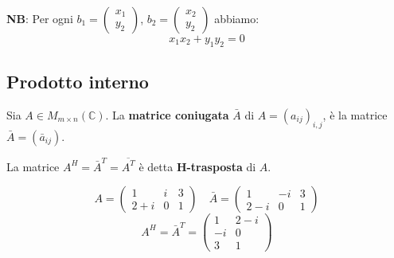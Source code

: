\documentclass[a4paper]{article}
\theoremstyle{break}
\theoremstyle{break}
\theoremstyle{break}
\theoremstyle{break}
\begin{document}
\begin{example}
\begin{figure}[H]
  \end{figure}
  \noindent \textbf{NB}: Per ogni \( b_1 = \begin{pmatrix} x_1\\y_2 \end{pmatrix} \),
  \( b_2 = \begin{pmatrix} x_2\\y_2 \end{pmatrix} \) abbiamo:
  \[
    x_1x_2 + y_1y_2 = 0
  \] 
\end{example}

\subsection{Prodotto interno}
\label{11.1}
Sia \( A \in M_{m \times n}(\mathbb{C}) \). La \textbf{matrice coniugata} \( \bar{A} \) di
\( A = (a_{ij})_{i,j} \), è la matrice \( \bar{A} = (\bar{a}_{ij}) \).

\noindent La matrice \( A^H = \bar{A}^T = \overline{A^T} \) è detta
\textbf{H-trasposta} di \( A \).

\begin{example}
  \[
  A = \begin{pmatrix} 
    1 & i & 3\\
    2+i & 0 & 1
  \end{pmatrix} 
  \quad
  \bar{A} = \begin{pmatrix} 
    1 & -i & 3\\
    2-i & 0 & 1
  \end{pmatrix}
  \] 
  \[
    A^H = \bar{A}^T = \begin{pmatrix} 
      1 & 2-i\\
      -i & 0\\
      3 & 1
    \end{pmatrix} 
  \] 
\end{example}
\end{document}
